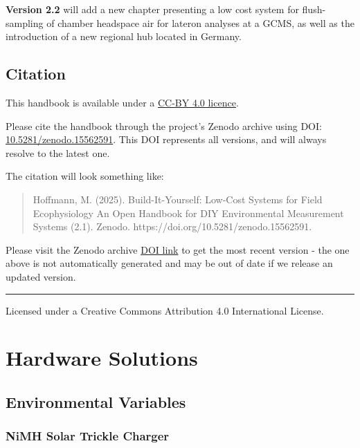 \documentclass[
  11pt,
  letterpaper,
]{book}
\begin{document}
\textbf{Version 2.2} will add a new chapter presenting a low cost system
for flush-sampling of chamber headspace air for lateron analyses at a
GCMS, as well as the introduction of a new regional hub located in
Germany.

\section{Citation}\label{sec-citation}

This handbook is available under a
\href{https://github.com/zalf-lli/LCSfFE-handbook/blob/main/LICENSE.md}{CC-BY
4.0 licence}.

Please cite the handbook through the project's Zenodo archive using DOI:
\href{https://doi.org/10.5281/zenodo.15562591}{10.5281/zenodo.15562591}.
This DOI represents all versions, and will always resolve to the latest
one.

The citation will look something like:

\begin{quote}
Hoffmann, M. (2025). Build-It-Yourself: Low-Cost Systems for Field
Ecophysiology An Open Handbook for DIY Environmental Measurement Systems
(2.1). Zenodo. https://doi.org/10.5281/zenodo.15562591.
\end{quote}

Please visit the Zenodo archive
\href{https://doi.org/10.5281/zenodo.15562591}{DOI link} to get the most
recent version - the one above is not automatically generated and may be
out of date if we release an updated version.

\begin{center}\rule{0.5\linewidth}{0.5pt}\end{center}

Licensed under a Creative Commons Attribution 4.0 International License.


\chapter{Hardware Solutions}\label{hardware-solutions}

\section{Environmental Variables}\label{sec-environmental-variables}

\subsection{NiMH Solar Trickle Charger}\label{sec-solar-charger}
\end{document}
